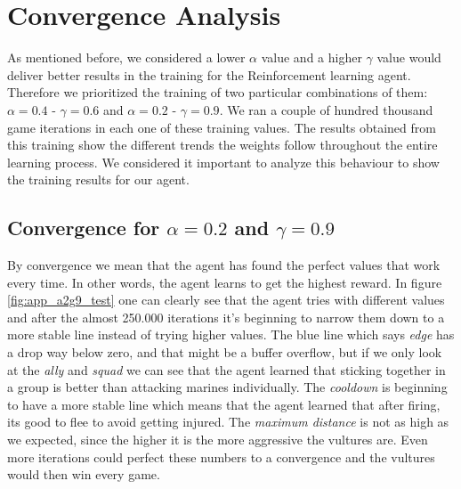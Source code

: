 \section{Convergence Analysis}

As mentioned before, we considered a lower $\alpha$ value and a higher $\gamma$ value would deliver better results in the training for the Reinforcement learning agent. Therefore we prioritized the training of two particular combinations of them: $\alpha= 0.4$ - $\gamma = 0.6$ and $\alpha= 0.2$ - $\gamma = 0.9$. We ran a couple of hundred thousand game iterations in each one of these training values. The results obtained from this training show the different trends the weights follow throughout the entire learning process. We considered it important to analyze this behaviour to show the training results for our agent. \\


\subsection*{Convergence for $\alpha= 0.2$ and $\gamma = 0.9$}

By convergence we mean that the agent has found the perfect values that work every time. In other words, the agent learns to get the highest reward. In figure \ref{fig:app_a2g9_test} one can clearly see that the agent tries with different values and after the almost 250.000 iterations it's beginning to narrow them down to a more stable line instead of trying higher values. The blue line which says \textit{edge} has a drop way below zero, and that might be a buffer overflow, but if we only look at the \textit{ally} and \textit{squad} we can see that the agent learned that sticking together in a group is better than attacking marines individually. The \textit{cooldown} is beginning to have a more stable line which means that the agent learned that after firing, its good to flee to avoid getting injured. The \textit{maximum distance} is not as high as we expected, since the higher it is the more aggressive the vultures are. Even more iterations could perfect these numbers to a convergence and the vultures would then win every game. 


